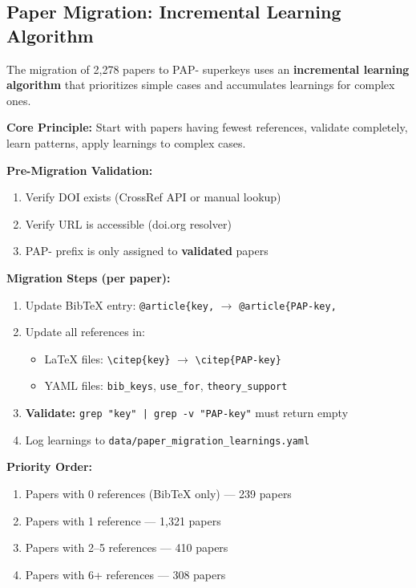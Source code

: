 \subsection{Paper Migration: Incremental Learning Algorithm}
\label{sec:paper-migration-algorithm}

The migration of 2,278 papers to PAP- superkeys uses an \textbf{incremental learning
algorithm} that prioritizes simple cases and accumulates learnings for complex ones.

\begin{tcolorbox}[colback=yellow!5!white, colframe=yellow!75!black,
    title=Paper Migration Algorithm (Incremental Learning)]

\textbf{Core Principle:} Start with papers having fewest references, validate completely,
learn patterns, apply learnings to complex cases.

\textbf{Pre-Migration Validation:}
\begin{enumerate}[nosep]
    \item Verify DOI exists (CrossRef API or manual lookup)
    \item Verify URL is accessible (doi.org resolver)
    \item PAP- prefix is only assigned to \textbf{validated} papers
\end{enumerate}

\textbf{Migration Steps (per paper):}
\begin{enumerate}[nosep]
    \item Update BibTeX entry: \texttt{@article\{key,} $\rightarrow$ \texttt{@article\{PAP-key,}
    \item Update all references in:
    \begin{itemize}[nosep]
        \item LaTeX files: \verb|\citep{key}| $\rightarrow$ \verb|\citep{PAP-key}|
        \item YAML files: \texttt{bib\_keys}, \texttt{use\_for}, \texttt{theory\_support}
    \end{itemize}
    \item \textbf{Validate:} \texttt{grep "key" | grep -v "PAP-key"} must return empty
    \item Log learnings to \texttt{data/paper\_migration\_learnings.yaml}
\end{enumerate}

\textbf{Priority Order:}
\begin{enumerate}[nosep]
    \item Papers with 0 references (BibTeX only) --- 239 papers
    \item Papers with 1 reference --- 1,321 papers
    \item Papers with 2--5 references --- 410 papers
    \item Papers with 6+ references --- 308 papers
\end{enumerate}


\end{tcolorbox}
